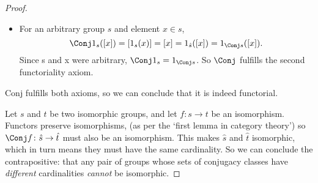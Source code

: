 \documentclass[../../main]{subfiles}
\begin{document}
\begin{proof}
\begin{itemize}
			\item For an arbitrary group \(s\) and element \(x\in s\),
				\[\Conj 1_s([x])=[1_s(x)]=[x]=1_{\hat{s}}([x])=1_{\Conj s}([x]).\] Since s and x
				were arbitrary, \(\Conj 1_{s}=1_{\Conj s}\). So \(\Conj \) fulfills the second
				functoriality axiom.
		\end{itemize}
		Conj fulfills both axioms, so we can conclude that it is indeed
		functorial.

		Let \(s\) and \(t\) be two isomorphic groups, and let \(f\colon s\to t\) be
		an isomorphism. Functors preserve isomorphisms, (as per the `first lemma in
		category theory') so \(\Conj f\colon \hat{s}\to \hat{t}\) must also be an isomorphism.
		This makes \(\hat{s}\) and \(\hat{t}\) isomorphic, which in turn means they must
		have the same cardinality. So we can conclude the contrapositive: that any
		pair of groups whose sets of conjugacy classes have \textit{different}
		cardinalities \textit{cannot} be isomorphic.

	\end{proof}
	
\end{document}
